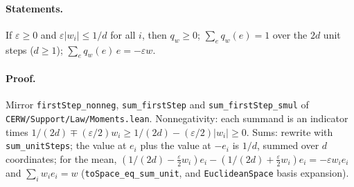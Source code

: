 \paragraph{Statements.} If $\varepsilon\ge0$ and $\varepsilon|w_i|\le1/d$ for all $i$, then $q_w\ge0$;
$\sum_{e}q_w(e)=1$ over the $2d$ unit steps ($d\ge1$); $\sum_eq_w(e)\,e=-\varepsilon w$.
\paragraph{Proof.} Mirror \texttt{firstStep\_nonneg}, \texttt{sum\_firstStep} and
\texttt{sum\_firstStep\_smul} of \texttt{CERW/Support/Law/Moments.lean}. Nonnegativity: each summand
is an indicator times $1/(2d)\mp(\varepsilon/2)w_i\ge1/(2d)-(\varepsilon/2)|w_i|\ge0$. Sums: rewrite
with \texttt{sum\_unitSteps}; the value at $e_i$ plus the value at $-e_i$ is $1/d$, summed over $d$
coordinates; for the mean, $(1/(2d)-\tfrac\varepsilon2w_i)e_i-(1/(2d)+\tfrac\varepsilon2w_i)e_i
=-\varepsilon w_ie_i$ and $\sum_iw_ie_i=w$ (\texttt{toSpace\_eq\_sum\_unit}, and
\texttt{EuclideanSpace} basis expansion).
